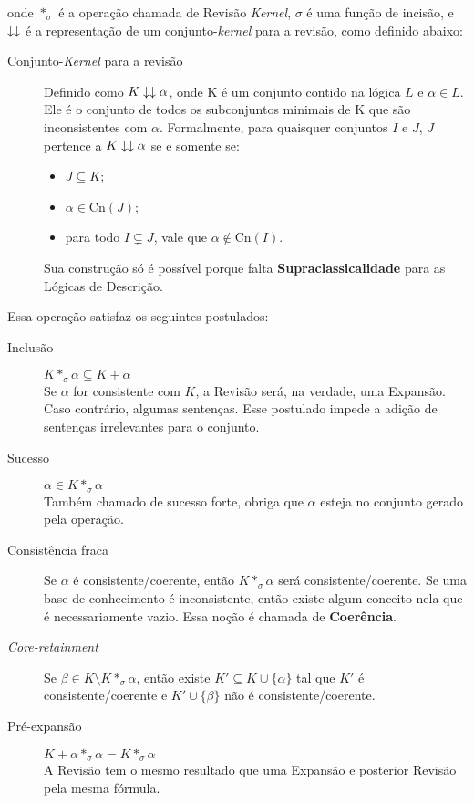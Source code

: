 onde $ \ast_{\sigma} $ é a operação chamada de Revisão \textit{Kernel}, $ \sigma $ é uma função de incisão, e $ \downarrow\downarrow $ é a representação de um conjunto-\textit{kernel} para a revisão, como definido abaixo:

\begin{description}
	\item[Conjunto-\textit{Kernel} para a revisão] Definido como $ K \downarrow\downarrow \alpha $, onde K é um conjunto contido na lógica $ L $ e $ \alpha \in L $. Ele é o conjunto de todos os subconjuntos minimais de K que são inconsistentes com $ \alpha $. Formalmente, para quaisquer conjuntos $ I $ e $ J $, $ J $ pertence a $ K \downarrow\downarrow \alpha $ se e somente se:
	\begin{itemize}
		\item $ J \subseteq K $;
		\item $ \alpha \in \text{Cn}(J) $;
		\item para todo $ I \subsetneq J $, vale que $ \alpha \notin \text{Cn}(I) $.
	\end{itemize}
	Sua construção só é possível porque falta \textbf{Supraclassicalidade} para as Lógicas de Descrição.  
\end{description}

Essa operação satisfaz os seguintes postulados:

\begin{description}
	\item[Inclusão] $ K \ast_\sigma \alpha \subseteq K + \alpha $ \\
	Se $ \alpha $ for consistente com $ K $, a Revisão será, na verdade, uma Expansão. Caso contrário, algumas sentenças. Esse postulado impede a adição de sentenças irrelevantes para o conjunto.
	\item[Sucesso] $ \alpha \in K \ast_\sigma \alpha $\\
	Também chamado de sucesso forte, obriga que $ \alpha $ esteja no conjunto gerado pela operação.
	\item[Consistência fraca] Se $ \alpha $ é consistente/coerente, então $ K \ast_\sigma \alpha $ será consistente/coerente. Se uma base de conhecimento é inconsistente, então existe algum conceito nela que é necessariamente vazio. Essa noção é chamada de \textbf{Coerência}.
	\item[\textit{Core-retainment}] Se $ \beta \in K \setminus K \ast_\sigma \alpha $, então existe $ K' \subseteq K \cup \{\alpha\} $ tal que $ K' $ é consistente/coerente e $ K' \cup \{\beta\}$ não é consistente/coerente.
	\item[Pré-expansão] $ K + \alpha \ast_\sigma \alpha = K \ast_\sigma \alpha $ \\
	A Revisão tem o mesmo resultado que uma Expansão e posterior Revisão pela mesma fórmula. 
\end{description}

